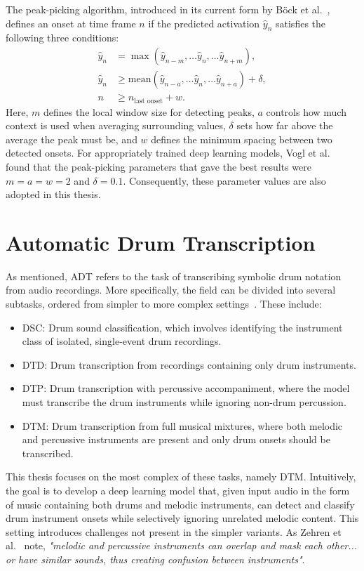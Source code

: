 The peak-picking algorithm, introduced in its current form by Böck et al.~\cite{Bck2012EvaluatingTO}, defines an onset at time frame $n$ if the predicted activation $\hat{y}_n$ satisfies the following three conditions:
\begin{align*} 
    \hat{y}_n &= \max(\hat{y}_{n - m}, \dots \hat{y}_n, \dots \hat{y}_{n + m}), \\ 
    \hat{y}_n &\ge \text{mean}(\hat{y}_{n - a}, \dots \hat{y}_n, \dots \hat{y}_{n + a}) + \delta, \\
    n &\ge n_\text{last onset} + w.
\end{align*}
Here, $m$ defines the local window size for detecting peaks, $a$ controls how much context is used when averaging surrounding values, $\delta$ sets how far above the average the peak must be, and $w$ defines the minimum spacing between two detected onsets. For appropriately trained deep learning models, Vogl et al.~\cite{vogl2018multiinstrumentdrumtranscription} found that the peak-picking parameters that gave the best results were $m = a = w = 2$ and $\delta = 0.1$. Consequently, these parameter values are also adopted in this thesis.


\section{Automatic Drum Transcription}

As mentioned, \acrfull{ADT} refers to the task of transcribing symbolic drum notation from audio recordings. More specifically, the field can be divided into several subtasks, ordered from simpler to more complex settings~\cite{8350302}. These include:
\begin{itemize}
    \item \acrshort{DSC}: Drum sound classification, which involves identifying the instrument class of isolated, single-event drum recordings.
    \item \acrshort{DTD}: Drum transcription from recordings containing only drum instruments.
    \item \acrshort{DTP}: Drum transcription with percussive accompaniment, where the model must transcribe the drum instruments while ignoring non-drum percussion.
    \item \acrshort{DTM}: Drum transcription from full musical mixtures, where both melodic and percussive instruments are present and only drum onsets should be transcribed.
\end{itemize}

This thesis focuses on the most complex of these tasks, namely \acrfull{DTM}. Intuitively, the goal is to develop a deep learning model that, given input audio in the form of music containing both drums and melodic instruments, can detect and classify drum instrument onsets while selectively ignoring unrelated melodic content. This setting introduces challenges not present in the simpler variants. As Zehren et al.~\cite{signals4040042} note, \textit{"melodic and percussive instruments can overlap and mask each other... or have similar sounds, thus creating confusion between instruments"}.

